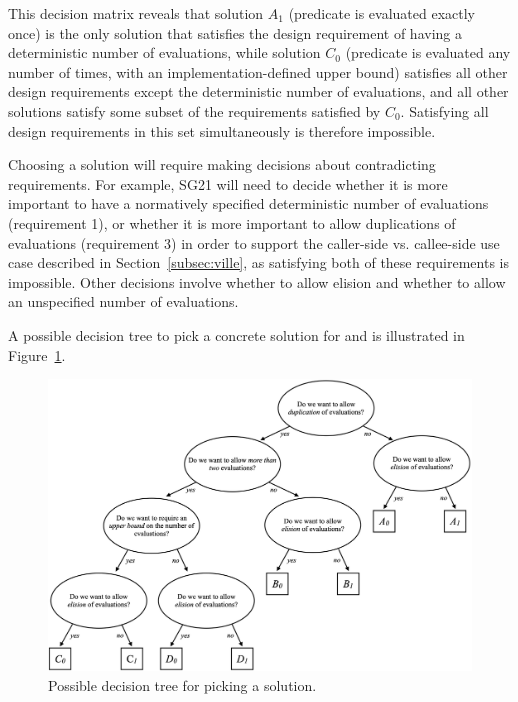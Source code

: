 This decision matrix reveals that solution $A_1$ (predicate is evaluated exactly once) is the only solution that satisfies the design requirement of having a deterministic number of evaluations, while solution $C_0$ (predicate is evaluated any number of times, with an implementation-defined upper bound) satisfies all other design requirements except the deterministic number of evaluations, and all other solutions satisfy some subset of the requirements satisfied by $C_0$. Satisfying all design requirements in this set simultaneously is therefore impossible.

Choosing a solution will require making decisions about contradicting requirements. For example, SG21 will need to decide  whether it is more important to have a normatively specified deterministic number of evaluations (requirement 1), or whether it is more important to allow duplications of evaluations (requirement 3) in order to support the caller-side vs. callee-side use case described in Section~\ref{subsec:ville}, as satisfying both of these requirements is impossible. Other decisions involve whether to allow elision and whether to allow an unspecified number of evaluations.


A possible decision tree to pick a concrete solution for  and  is illustrated in Figure~\ref{fig:prepost}.

\begin{figure}%
\centering
  \includegraphics[width=1\linewidth]{images/p3228_fig1.png}
  \vspace{2mm}
  \caption{Possible decision tree for picking a solution.}
  \label{fig:prepost}
\end{figure}


